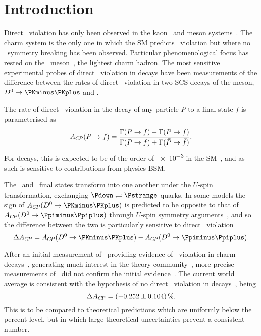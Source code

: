 \chapter{Introduction}
\label{chap:cpv:introduction}

Direct \CP\ violation has only been observed in the
kaon~\cite{Christenson:1964fg,Batley:2002gn} and \PB meson
systems~\cite{Aubert:2001nu,Abe:2001xe,Aaij:2012kz,Aaij:2013iua}.
The charm system is the only one in which the \ac{SM} predicts \CP\ violation
but where no \CP\ symmetry breaking has been observed.
Particular phenomenological focus has rested on the \PDzero\
meson~\cite{Grossman:2006jg}, the lightest charm hadron.
The most sensitive experimental probes of direct \CP\ violation in \PDzero
decays have been measurements of the difference between the rates of direct
\CP\ violation in two \ac{SCS} decays of the \PDzero meson,
$\decay{\PDzero}{\KmKp}$ and \pimpip.

The rate of direct \CP\ violation in the decay of any particle $P$ to a final
state $f$ is parameterised as
\begin{equation}
  \ACP(\decay{P}{f}) = \frac{%
    \Gamma(\decay{P}{f}) - \Gamma(\decay{\bar{P}}{\bar{f}})
  }{%
    \Gamma(\decay{P}{f}) + \Gamma(\decay{\bar{P}}{\bar{f}})
  }.
  \label{eqn:cpv:introduction:acp}
\end{equation}
For \decay{\PDzero}{\hmhp} decays, this is expected to be of the order of
\num{e-3} in the \ac{SM}~\cite{Grossman:2006jg}, and as such is sensitive to
contributions from physics \acl{BSM}.

The \KmKp\ and \pimpip\ final states transform into one another under the 
$U$-spin transformation, exchanging $\Pdown \rightleftharpoons \Pstrange$ 
quarks. In some models the sign of $\ACP(\decay{\PDzero}{\KmKp})$ is predicted 
to be opposite to that of $\ACP(\decay{\PDzero}{\pimpip})$ through $U$-spin 
symmetry arguments~\cite{Grossman:2006jg}, and so the difference between the 
two is particularly sensitive to direct \CP\ violation
\begin{equation}
  \dACP = \ACP(\decay{\PDzero}{\KmKp}) - \ACP(\decay{\PDzero}{\pimpip}).
  \label{eqn:cpv:introduction:dacp_pure}
\end{equation}

After an initial measurement of \dACP\ providing evidence of \CP\ violation in
charm decays~\cite{Aaij:2011in,Lenz:2013pwa}, generating much interest in the
theory community~\cite{Lenz:2013pwa}, more precise measurements of \dACP\ did
not confirm the initial evidence~\cite{Aaij:2014gsa,Aaij:2016cfh}.
The current world average is consistent with the hypothesis of no direct \CP\
violation in \PDzero decays~\cite{Amhis:2014hma}, being\footnotemark
\begin{equation}
  \dACP = \SI{-0.252 \pm 0.104}{\percent}.
  \label{eqn:cpv:introduction:dacp_world_average}
\end{equation}
This is to be compared to theoretical predictions which are uniformly below the 
percent level, but in which large theoretical uncertainties prevent a 
consistent number.

